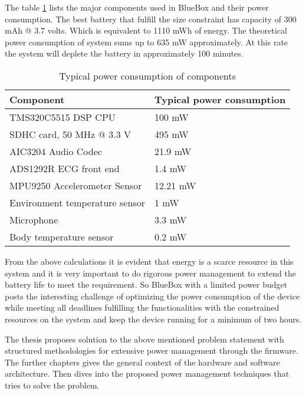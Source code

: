 \hspace{10mm}The table \ref{table:power_rating} lists the major components used in BlueBox and their power consumption. The best battery that fulfill the size constraint has capacity of 300 mAh @ 3.7 volts. Which is equivalent to 1110 mWh of energy. The theoretical power consumption of system sums up to 635 mW approximately. At this rate the system will deplete the battery in approximately 100 minutes. 
\begin{table}[h]
	\centering
	\begin{tabular}{|l|l|}
		\hline
		Component & Typical power consumption\\
		\hline
		TMS320C5515 DSP CPU &  100 mW \\
		SDHC card, 50 MHz @ 3.3 V   &  495 mW \\
		AIC3204 Audio Codec  &  21.9 mW \\	
		ADS1292R ECG front end & 1.4 mW \\
		MPU9250 Accelerometer Sensor &  12.21 mW \\
		Environment temperature sensor  &  1 mW \\
		Microphone  & 3.3 mW \\
		Body temperature sensor  &  0.2 mW \\	
		\hline
	\end{tabular}
	\caption{Typical power consumption of components}
	\label{table:power_rating}
\end{table}
\vspace*{-2mm}

\hspace{10mm}From the above  calculations it is evident that energy is a scarce resource in this system and it is very important to do rigorous power management to extend the battery life to meet the requirement. So BlueBox with a limited power budget posts the interesting challenge of optimizing the power consumption of the  device while meeting all deadlines fulfilling the functionalities with the constrained resources on the system and keep the device running for a minimum of two hours.

\hspace{10mm}The thesis proposes solution to the above mentioned problem statement with structured methodologies for extensive power management through the firmware. The further chapters gives the general context of the hardware and software architecture. Then dives into the proposed power management techniques that tries to solve the problem.


